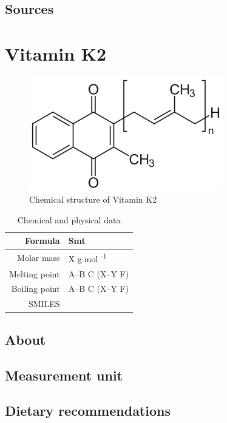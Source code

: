 \documentclass{book}
\begin{document}
\section{Sources}


\chapter{Vitamin K2}
\begin{figure}[h]
	\caption{Chemical structure of Vitamin K2}
	\centering \includegraphics[width=0.75\textwidth]{images/Vitamin_K2_chemical_structure}
\end{figure}

\begin{table}[h]
	\caption{Chemical and physical data}
	\centering \begin{tabular}{| r | l |}
		\hline
		Formula & Smt\\ \hline
		Molar mass & X g$\cdot$mol \textsuperscript{-1}\\ \hline
		Melting point & A--B \degree C (X--Y \degree F)\\ \hline
		Boiling point & A--B \degree C (X--Y \degree F)\\ \hline
		SMILES & \\ \hline
	\end{tabular}
\end{table}
\newpage

\section{About}


\section{Measurement unit}


\section{Dietary recommendations}
\end{document}
